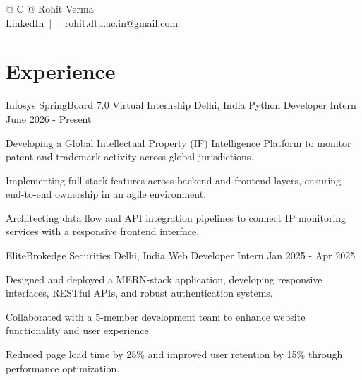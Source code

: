 \documentclass[a4paper,10pt]{article}
\begin{document}
\pagestyle{empty} 


\newcommand{\name}{Rohit Verma}
\newcommand{\emaila}{rohit.dtu.ac.in@gmail.com}
\newcommand{\linkedin}{\href{https://linkedin.com/in/rohit-verma-211rv}{LinkedIn}}

\begin{tabularx}{\linewidth}{@{} C @{}}
\Huge{\name}\\[7.5pt]

\linkedin \ $|$ \
\href{mailto:\emaila}{\raisebox{-0.05\height}\faEnvelope\ \emaila}
\end{tabularx}


\section{Experience}


\resumeSubheading
{Infosys SpringBoard 7.0 Virtual Internship}
{Delhi, India}
{Python Developer Intern}
{June 2026 - Present}

\resumeItemListStart
\item Developing a Global Intellectual Property (IP) Intelligence Platform to monitor patent and trademark activity across global jurisdictions.
\item Implementing full-stack features across backend and frontend layers, ensuring end-to-end ownership in an agile environment.
\item Architecting data flow and API integration pipelines to connect IP monitoring services with a responsive frontend interface.
\resumeItemListEnd

\vspace{-5pt}


\resumeSubheading
{EliteBrokedge Securities}
{Delhi, India}
{Web Developer Intern}
{Jan 2025 - Apr 2025}

\resumeItemListStart
\item Designed and deployed a MERN-stack application, developing responsive interfaces, RESTful APIs, and robust authentication systems.
\item Collaborated with a 5-member development team to enhance website functionality and user experience.
\item Reduced page load time by 25\% and improved user retention by 15\% through performance optimization.
\resumeItemListEnd
\end{document}
